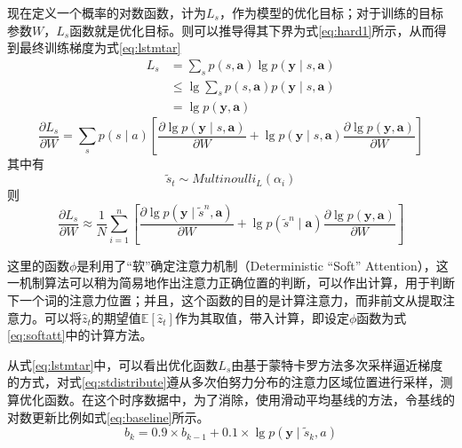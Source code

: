 现在定义一个概率的对数函数，计为$L_s$，作为模型的优化目标；对于训练的目标参数$W$，$L_s$函数就是优化目标。则可以推导得其下界为式\eqref{eq:hard1}所示，从而得到最终训练梯度为式\eqref{eq:lstmtar}
\begin{equation}
    \begin{aligned}
        && L_s &= \sum_s p(s, \textbf{a}) \lg p(\textbf{y}\mid {s }, \textbf{a} ) \\
        && & \le \lg \sum_sp(s, \textbf{a}) p(\textbf{y}\mid {s }, \textbf{a} ) \\
        && & = \lg p(\textbf{y}, \textbf{a})
    \end{aligned}
    \label{eq:hard1}
\end{equation}
\begin{equation}
    \frac{\partial L_s}{\partial W} = \sum_s p(s \mid a) [\frac{\partial \lg p(\textbf{y}\mid {s }, \textbf{a} )}{\partial W} + \lg p(\textbf{y}\mid {s }, \textbf{a} ) \frac{\partial \lg p(\textbf{y}, \textbf{a})}{\partial W} ]
    \label{eq:lstmtar}
\end{equation}
其中有
\begin{equation}
    \tilde{s}_t \sim Multinoulli_L({\alpha_i})
    \label{eq:stdistribute}
\end{equation}
则
\begin{equation}
    \frac{\partial L_s}{\partial W} \approx \frac{1}{N} \sum_{i=1}^{n} [\frac{\partial \lg p(\textbf{y}\mid \tilde{s}^n, \textbf{a} )}{\partial W} + \lg p(\tilde{s}^n \mid \textbf{a} ) \frac{\partial \lg p(\textbf{y}, \textbf{a})}{\partial W} ]
    \label{eq:lstmtar2}
\end{equation}

这里的函数$\phi$是利用了“软”确定注意力机制（Deterministic “Soft” Attention），这一机制算法可以稍为简易地作出注意力正确位置的判断，可以作出计算，用于判断下一个词的注意力位置；并且，这个函数的目的是计算注意力，而非前文从提取注意力。可以将$\hat{z}_t$的期望值$\mathbb{E} [\hat{z}_t]$作为其取值，带入计算，即设定$\phi$函数为式\eqref{eq:softatt}中的计算方法。

从式\eqref{eq:lstmtar}中，可以看出优化函数$L_s$由基于蒙特卡罗方法多次采样逼近梯度的方式，对式\eqref{eq:stdistribute}遵从多次伯努力分布的注意力区域位置进行采样，测算优化函数。在这个时序数据中，为了消除，使用滑动平均基线的方法，令基线的对数更新比例如式\eqref{eq:baseline}所示。
\begin{equation}
    \label{eq:baseline}
    b_k = 0.9 \times b_{k-1} + 0.1 \times \lg p(\textbf{y} \mid \tilde{s}_k, a)
\end{equation}

